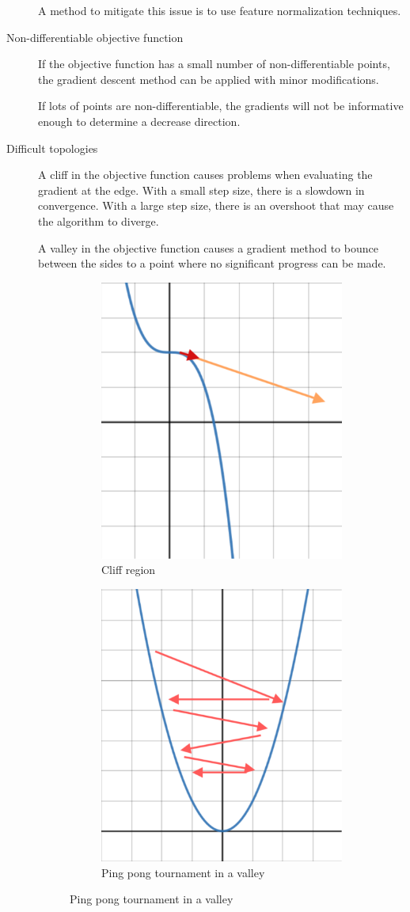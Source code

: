 \begin{description}
        A method to mitigate this issue is to use feature normalization techniques.

    \item[Non-differentiable objective function]
        If the objective function has a small number of non-differentiable points,
        the gradient descent method can be applied with minor modifications.
        
        If lots of points are non-differentiable, the gradients will not be informative enough 
        to determine a decrease direction.

    \item[Difficult topologies]
        A cliff in the objective function causes problems when evaluating the gradient at the edge.
        With a small step size, there is a slowdown in convergence. 
        With a large step size, there is an overshoot that may cause the algorithm to diverge.

        A valley in the objective function causes a gradient method to bounce between the sides
        to a point where no significant progress can be made.

        \begin{figure}[H]
            \begin{subfigure}{.5\textwidth}
                \centering
                \includegraphics[width=.30\linewidth]{img/cliff.png}
                \caption{Cliff region}
            \end{subfigure}%
            \begin{subfigure}{.5\textwidth}
                \centering
                \includegraphics[width=.30\linewidth]{img/valley.png}
                \caption{Ping pong tournament in a valley}
            \end{subfigure}
        \end{figure}
\end{description}



